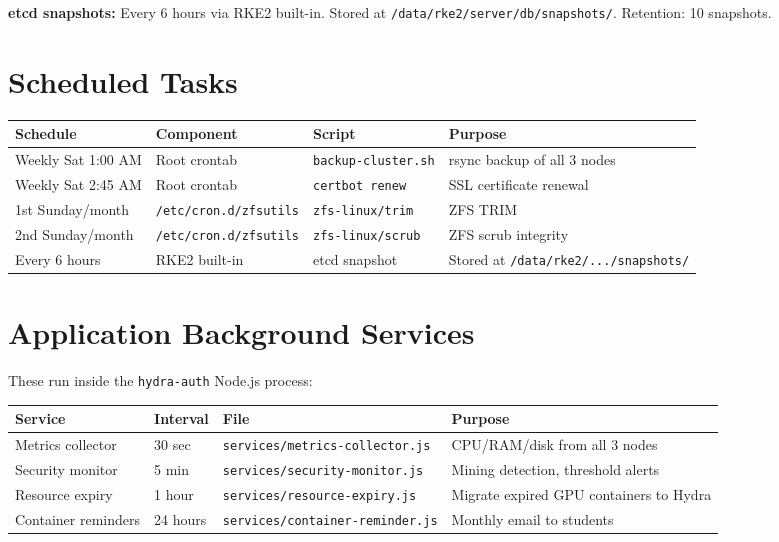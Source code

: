 \documentclass[11pt,a4paper]{article}
\begin{document}
\textbf{etcd snapshots:} Every 6 hours via RKE2 built-in. Stored at \texttt{/data/rke2/server/db/snapshots/}. Retention: 10 snapshots.

\section{Scheduled Tasks}

\begin{table}[H]
\centering
\begin{tabular}{lllp{5cm}}
\toprule
\textbf{Schedule} & \textbf{Component} & \textbf{Script} & \textbf{Purpose} \\
\midrule
Weekly Sat 1:00 AM & Root crontab & \texttt{backup-cluster.sh} & rsync backup of all 3 nodes \\
Weekly Sat 2:45 AM & Root crontab & \texttt{certbot renew} & SSL certificate renewal \\
1st Sunday/month & \texttt{/etc/cron.d/zfsutils} & \texttt{zfs-linux/trim} & ZFS TRIM \\
2nd Sunday/month & \texttt{/etc/cron.d/zfsutils} & \texttt{zfs-linux/scrub} & ZFS scrub integrity \\
Every 6 hours & RKE2 built-in & etcd snapshot & Stored at \texttt{/data/rke2/.../snapshots/} \\
\bottomrule
\end{tabular}
\end{table}

\section{Application Background Services}

These run inside the \texttt{hydra-auth} Node.js process:

\begin{table}[H]
\centering
\begin{tabular}{lllp{4.5cm}}
\toprule
\textbf{Service} & \textbf{Interval} & \textbf{File} & \textbf{Purpose} \\
\midrule
Metrics collector & 30 sec & \texttt{services/metrics-collector.js} & CPU/RAM/disk from all 3 nodes \\
Security monitor & 5 min & \texttt{services/security-monitor.js} & Mining detection, threshold alerts \\
Resource expiry & 1 hour & \texttt{services/resource-expiry.js} & Migrate expired GPU containers to Hydra \\
Container reminders & 24 hours & \texttt{services/container-reminder.js} & Monthly email to students \\
\bottomrule
\end{tabular}
\end{table}
\end{document}
